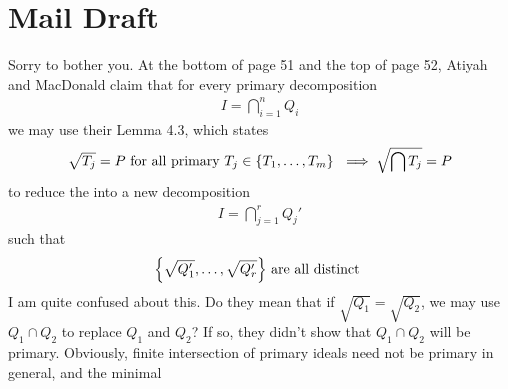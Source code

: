 \documentclass{report}
\begin{document}
\section{Mail Draft}
Sorry to bother you. At the bottom of page 51 and the top of page 52, Atiyah and MacDonald claim that for every primary decomposition 
\begin{align}
\label{prim}
I = \bigcap_{i=1}^n Q_i
\end{align}
we may use their Lemma 4.3, which states 
\begin{align*}
\sqrt{T_j}=P\text{ for all primary $T_j \in \{ T_1,\dots ,T_m \}$ } \implies \sqrt{\bigcap T_j}=P 
\end{align*}
to reduce  the  into a new decomposition 
\begin{align*}
I = \bigcap_{j=1}^r Q_j'
\end{align*}
such that
\begin{align*}
\Big\{ \sqrt{Q_1'},\dots ,\sqrt{Q_r'}   \Big\}\text{ are all distinct }
\end{align*}
I am quite confused about this. Do they mean that if $\sqrt{Q_1}=\sqrt{Q_2}$, we may use $Q_1 \cap Q_2$ to replace $Q_1$ and  $Q_2$? If so, they didn't show that $Q_1\cap Q_2$ will be primary. Obviously, finite intersection of primary ideals need not be primary in general, and the minimal  
\end{document}
